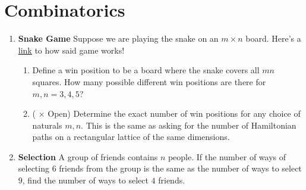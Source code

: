 \documentclass[11pt]{scrartcl}
\begin{document}
\newpage
\section{Combinatorics}
\begin{enumerate}[label=\textbf{C\arabic*}.]
    \item \textbf{Snake Game} \newline
    Suppose we are playing the snake on an $m \times n$ board. Here's a \href{https://en.wikipedia.org/wiki/Snake_(video_game_genre)}{link} to how said game works!

    \begin{enumerate}
        \item Define a win position to be a board where the snake covers all $mn$ squares. How many possible different win positions are there for $m, n = 3, 4, 5$?
    
        \item (\fullchili \hspace{1pt} $\times$ Open) Determine the exact number of win positions for any choice of naturals $m, n$. This is the same as asking for the number of Hamiltonian paths on a rectangular lattice of the same dimensions.
    \end{enumerate}

    \item \textbf{Selection} \newline
    A group of friends contains $n$ people. If the number of ways of selecting $6$ friends from the group is the same as the number of ways to select $9$, find the number of ways to select $4$ friends.
    
\end{enumerate}

\newpage
\end{document}
